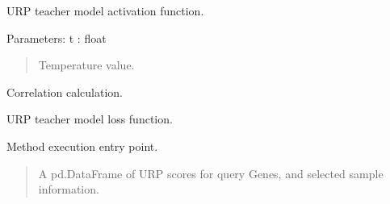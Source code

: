 \documentclass[letterpaper,10pt,english]{sphinxmanual}
\begin{document}
\begin{fulllineitems}
\begin{fulllineitems}
\end{fulllineitems}


\begin{fulllineitems}
\label{\detokenize{index:TRAPT.DLFS.FeatureSelection.get_act}}
\pysigstartsignatures
{}
\pysigstopsignatures
\sphinxAtStartPar
U\sphinxhyphen{}RP teacher model activation function.

\sphinxAtStartPar
Parameters:
t : float
\begin{quote}

\sphinxAtStartPar
Temperature value.
\end{quote}

\end{fulllineitems}


\begin{fulllineitems}
\label{\detokenize{index:TRAPT.DLFS.FeatureSelection.get_corr}}
\pysigstartsignatures
{}
\pysigstopsignatures
\sphinxAtStartPar
Correlation calculation.

\end{fulllineitems}


\begin{fulllineitems}
\label{\detokenize{index:TRAPT.DLFS.FeatureSelection.get_loss}}
\pysigstartsignatures
{}
\pysigstopsignatures
\sphinxAtStartPar
U\sphinxhyphen{}RP teacher model loss function.

\end{fulllineitems}


\begin{fulllineitems}
\label{\detokenize{index:TRAPT.DLFS.FeatureSelection.run}}
\pysigstartsignatures
{}
\pysigstopsignatures
\sphinxAtStartPar
Method execution entry point.
\begin{quote}\begin{description}
\sphinxAtStartPar
A pd.DataFrame of U\sphinxhyphen{}RP scores for query Genes, and selected sample information.


\end{description}
\end{quote}
\end{fulllineitems}
\end{fulllineitems}
\end{document}
